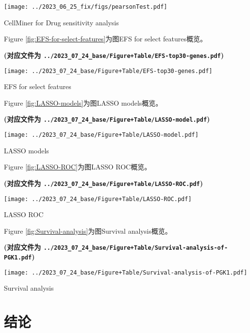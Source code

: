 \documentclass[
]{article}
\begin{document}
\def\@captype{figure}
\begin{center}
\texttt{[image: ../2023\_06\_25\_fix/figs/pearsonTest.pdf]}
\caption{CellMiner for  Drug sensitivity analysis}\label{fig:CellMiner-for--Drug-sensitivity-analysis}
\end{center}

Figure \ref{fig:EFS-for-select-features}为图EFS for select features概览。

\textbf{(对应文件为 \texttt{../2023\_07\_24\_base/Figure+Table/EFS-top30-genes.pdf})}

\def\@captype{figure}
\begin{center}
\texttt{[image: ../2023\_07\_24\_base/Figure+Table/EFS-top30-genes.pdf]}
\caption{EFS for select features}\label{fig:EFS-for-select-features}
\end{center}

Figure \ref{fig:LASSO-models}为图LASSO models概览。

\textbf{(对应文件为 \texttt{../2023\_07\_24\_base/Figure+Table/LASSO-model.pdf})}

\def\@captype{figure}
\begin{center}
\texttt{[image: ../2023\_07\_24\_base/Figure+Table/LASSO-model.pdf]}
\caption{LASSO models}\label{fig:LASSO-models}
\end{center}

Figure \ref{fig:LASSO-ROC}为图LASSO ROC概览。

\textbf{(对应文件为 \texttt{../2023\_07\_24\_base/Figure+Table/LASSO-ROC.pdf})}

\def\@captype{figure}
\begin{center}
\texttt{[image: ../2023\_07\_24\_base/Figure+Table/LASSO-ROC.pdf]}
\caption{LASSO ROC}\label{fig:LASSO-ROC}
\end{center}

Figure \ref{fig:Survival-analysis}为图Survival analysis概览。

\textbf{(对应文件为 \texttt{../2023\_07\_24\_base/Figure+Table/Survival-analysis-of-PGK1.pdf})}

\def\@captype{figure}
\begin{center}
\texttt{[image: ../2023\_07\_24\_base/Figure+Table/Survival-analysis-of-PGK1.pdf]}
\caption{Survival analysis}\label{fig:Survival-analysis}
\end{center}

\hypertarget{dis}{%
\section{结论}\label{dis}}
\end{document}
